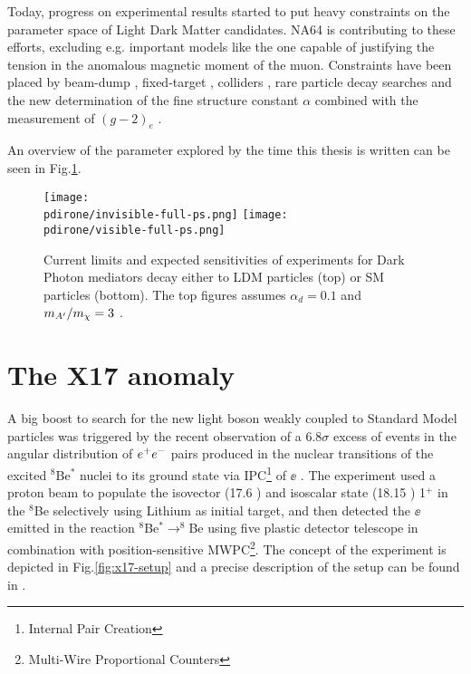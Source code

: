 Today, progress on experimental results started to put heavy constraints on the parameter space of Light Dark Matter candidates. NA64 is contributing to these efforts, excluding e.g. important models like the one capable of justifying the tension in the anomalous magnetic moment of the muon. Constraints have been placed by beam-dump \cite{jdb, charm, PhysRevLett.59.755, e137, konaka, PhysRevLett.67.2942, dav,  ath, nomad, e787, essig1, blum,sg1, blum1, sarah1}, fixed-target \cite{apex,merkel,merkel1}, colliders \cite{babar, curt, babar1}, rare particle decay searches \cite{sindrum, kloe, sg2, kloe2, wasa, hades, phenix, e949, na48, pol, kloe3} and the new determination of the fine structure constant $\alpha$ combined with the measurement of $(g-2)_e$ \cite{Parker191,PhysRevLett.100.120801}.

An overview of the parameter explored by the time this thesis is written can be seen in Fig.\ref{fig:dmplane-overview}.

\begin{figure}[bth!]
  \centering
  \texttt{[image: \\pdirone/invisible-full-ps.png]}
  \texttt{[image: \\pdirone/visible-full-ps.png]}
  \caption[Current exclusion limit and project for Dark Photon in the physics community]{Current limits and expected sensitivities of experiments for Dark Photon mediators decay either to LDM particles (top) or SM particles (bottom). The top figures assumes $\alpha_d = 0.1$ and $m_{A'}/m_{\chi} = 3$ \cite{pbc-book}.}
  \label{fig:dmplane-overview}
\end{figure}  

\section{The X17 anomaly}
\label{ch1:sec:dm-u1model-motivations-x17}

A big boost to search for the new light boson weakly coupled to Standard Model particles was triggered by the recent observation of a 6.8$\sigma$ excess of events in the angular distribution of $e^+e^-$ pairs produced in the nuclear transitions of the excited $^8$Be$^*$ nuclei to its ground state via IPC\footnote{Internal Pair Creation} of $\ee$ \cite{Krasznahorkay:2015iga}. The experiment used a proton beam to populate the isovector (17.6 \mev) and isoscalar state (18.15 \mev) 1$^+$ in the $^8$Be selectively using Lithium as initial target, and then detected the $\ee$ emitted in the reaction $^8$Be$^* \to ^8$Be using five plastic detector telescope in combination with position-sensitive MWPC\footnote{Multi-Wire Proportional Counters}. The concept of the experiment is depicted in Fig.\ref{fig:x17-setup} and a precise description of the setup can be found in \cite{GULYAS201621}.

